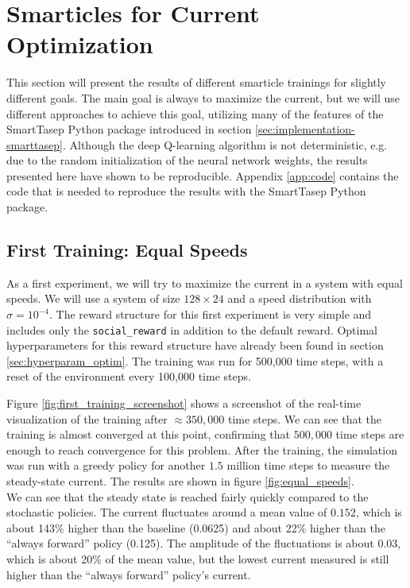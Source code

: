 \section{Smarticles for Current Optimization}
\label{sec:smarticle_current_optimization}
This section will present the results of different smarticle trainings for slightly different goals. The main goal is always to maximize the current, but we will use different approaches to achieve this goal, utilizing many of the features of the SmartTasep Python package introduced in section \ref{sec:implementation-smarttasep}. Although the deep Q-learning algorithm is not deterministic, e.g. due to the random initialization of the neural network weights, the results presented here have shown to be reproducible. Appendix \ref{app:code} contains the code that is needed to reproduce the results with the SmartTasep Python package.

\subsection{First Training: Equal Speeds}
As a first experiment, we will try to maximize the current in a system with equal speeds. We will use a system of size $128 \times 24$ and a speed distribution with $\sigma=10^{-4}$. The reward structure for this first experiment is very simple and includes only the \texttt{social\_reward} in addition to the default reward. Optimal hyperparameters for this reward structure have already been found in section \ref{sec:hyperparam_optim}. The training was run for 500,000 time steps, with a reset of the environment every 100,000 time steps.


Figure \ref{fig:first_training_screenshot} shows a screenshot of the real-time visualization of the training after $\approx 350,000$ time steps. We can see that the training is almost converged at this point, confirming that $500,000$ time steps are enough to reach convergence for this problem. After the training, the simulation was run with a greedy policy for another $1.5$ million time steps to measure the steady-state current. The results are shown in figure \ref{fig:equal_speeds}. 
\\
We can see that the steady state is reached fairly quickly compared to the stochastic policies. The current fluctuates around a mean value of $0.152$, which is about 143\% higher than the baseline (0.0625) and about 22\% higher than the \enquote{always forward} policy (0.125). The amplitude of the fluctuations is about $0.03$, which is about 20\% of the mean value, but the lowest current measured is still higher than the \enquote{always forward} policy's current. 


